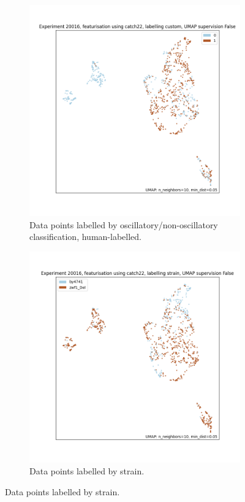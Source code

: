 \begin{figure}
  \centering
  \begin{subfigure}[t]{0.7\textwidth}
  \centering
    \includegraphics[width=\linewidth]{Figure_15}
    \caption{
      Data points labelled by oscillatory/non-oscillatory classification, human-labelled.
    }
    \label{fig:umap-osc}
  \end{subfigure}

  \begin{subfigure}[t]{0.7\textwidth}
  \centering
    \includegraphics[width=\linewidth]{Figure_13}
    \caption{
      Data points labelled by strain.
    }
    \label{fig:umap-strain}
  \end{subfigure}


\end{figure}
